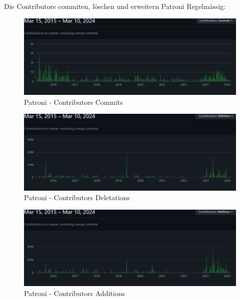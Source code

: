\begin{flushleft}
    Die Contributors commiten, löschen und erweitern Patroni Regelmässig:
    \begin{figure}[H]
        \centering
        \includegraphics[width=0.75\linewidth]{source/implementation/evaluation/postgresql_ha_solutions/insights/patroni/contributors_commits_zalando_patroni}
        \caption{Patroni - Contributors Commits}
        \label{fig:contributors_commits_zalando_patroni}
    \end{figure}
    \begin{figure}[H]
        \centering
        \includegraphics[width=0.75\linewidth]{source/implementation/evaluation/postgresql_ha_solutions/insights/patroni/contributors_deletations_zalando_patroni}
        \caption{Patroni - Contributors Deletations}
        \label{fig:contributors_deletations_zalando_patroni}
    \end{figure}
    \begin{figure}[H]
        \centering
        \includegraphics[width=0.75\linewidth]{source/implementation/evaluation/postgresql_ha_solutions/insights/patroni/contributors_additions_zalando_patroni}
        \caption{Patroni - Contributors Additions}
        \label{fig:contributors_additions_zalando_patroni}
    \end{figure}


\end{flushleft}
